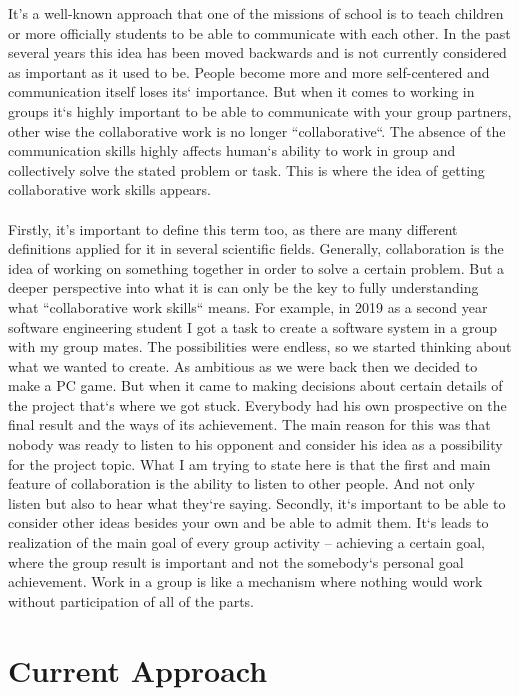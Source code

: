 \documentclass[10pt,oneside,english,a4paper]{article}
\begin{document}
It’s a well-known approach that one of the missions of school is to teach children or more officially students to be able to communicate with each other. In the past several years this idea has been moved backwards and is not currently considered as important as it used to be. People become more and more self-centered and communication itself loses its` importance. But when it comes to working in groups it`s highly important to be able to communicate with your group partners, other wise the collaborative work is no longer ``collaborative``. The absence of the communication skills highly affects human`s ability to work in group and collectively solve the stated problem or task. This is where the idea of getting collaborative work skills appears.\paragraph{}
Firstly, it’s important to define this term too, as there are many different definitions applied for it in several scientific fields. Generally, collaboration is the idea of working on something together in order to solve a certain problem. But a deeper perspective into what it is can only be the key to fully understanding what ``collaborative work skills`` means. For example, in 2019 as a second year software engineering student I got a task to create a software system in a group with my group mates. The possibilities were endless, so we started thinking about what we wanted to create. As ambitious as we were back then we decided to make a PC game. But when it came to making decisions about certain details of the project that`s where we got stuck. Everybody had his own prospective on the final result and the ways of its achievement. The main reason for this was that nobody was ready to listen to his opponent and consider his idea as a possibility for the project topic. What I am trying to state here is that the first and main feature of collaboration is the ability to listen to other people. And not only listen but also to hear what they`re saying. Secondly, it`s important to be able to consider other ideas besides your own and be able to admit them. It`s leads to realization of the main goal of every group activity – achieving a certain goal, where the group result is important and not the somebody`s personal goal achievement. Work in a group is like a mechanism where nothing would work without participation of all of the parts.

\section{Current Approach} \label{curr}
\end{document}
